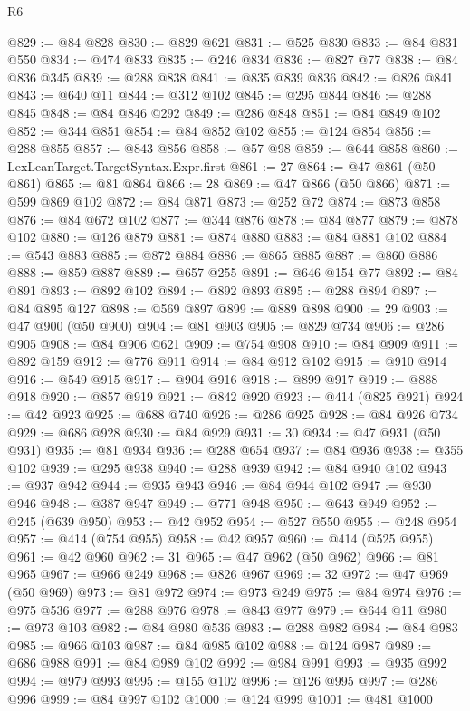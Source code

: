 \begin{lexlean}{R6}
\begin{coremodule}
@829 := @84 @828
@830 := @829 @621
@831 := @525 @830
@833 := @84 @831 @550
@834 := @474 @833
@835 := @246 @834
@836 := @827 @77
@838 := @84 @836 @345
@839 := @288 @838
@841 := @835 @839 @836
@842 := @826 @841
@843 := @640 @11
@844 := @312 @102
@845 := @295 @844
@846 := @288 @845
@848 := @84 @846 @292
@849 := @286 @848
@851 := @84 @849 @102
@852 := @344 @851
@854 := @84 @852 @102
@855 := @124 @854
@856 := @288 @855
@857 := @843 @856
@858 := @57 @98
@859 := @644 @858
@860 := LexLeanTarget.TargetSyntax.Expr.first
@861 := 27
@864 := @47 @861 (@50 @861)
@865 := @81 @864
@866 := 28
@869 := @47 @866 (@50 @866)
@871 := @599 @869 @102
@872 := @84 @871
@873 := @252 @72
@874 := @873 @858
@876 := @84 @672 @102
@877 := @344 @876
@878 := @84 @877
@879 := @878 @102
@880 := @126 @879
@881 := @874 @880
@883 := @84 @881 @102
@884 := @543 @883
@885 := @872 @884
@886 := @865 @885
@887 := @860 @886
@888 := @859 @887
@889 := @657 @255
@891 := @646 @154 @77
@892 := @84 @891
@893 := @892 @102
@894 := @892 @893
@895 := @288 @894
@897 := @84 @895 @127
@898 := @569 @897
@899 := @889 @898
@900 := 29
@903 := @47 @900 (@50 @900)
@904 := @81 @903
@905 := @829 @734
@906 := @286 @905
@908 := @84 @906 @621
@909 := @754 @908
@910 := @84 @909
@911 := @892 @159
@912 := @776 @911
@914 := @84 @912 @102
@915 := @910 @914
@916 := @549 @915
@917 := @904 @916
@918 := @899 @917
@919 := @888 @918
@920 := @857 @919
@921 := @842 @920
@923 := @414 (@825 @921)
@924 := @42 @923
@925 := @688 @740
@926 := @286 @925
@928 := @84 @926 @734
@929 := @686 @928
@930 := @84 @929
@931 := 30
@934 := @47 @931 (@50 @931)
@935 := @81 @934
@936 := @288 @654
@937 := @84 @936
@938 := @355 @102
@939 := @295 @938
@940 := @288 @939
@942 := @84 @940 @102
@943 := @937 @942
@944 := @935 @943
@946 := @84 @944 @102
@947 := @930 @946
@948 := @387 @947
@949 := @771 @948
@950 := @643 @949
@952 := @245 (@639 @950)
@953 := @42 @952
@954 := @527 @550
@955 := @248 @954
@957 := @414 (@754 @955)
@958 := @42 @957
@960 := @414 (@525 @955)
@961 := @42 @960
@962 := 31
@965 := @47 @962 (@50 @962)
@966 := @81 @965
@967 := @966 @249
@968 := @826 @967
@969 := 32
@972 := @47 @969 (@50 @969)
@973 := @81 @972
@974 := @973 @249
@975 := @84 @974
@976 := @975 @536
@977 := @288 @976
@978 := @843 @977
@979 := @644 @11
@980 := @973 @103
@982 := @84 @980 @536
@983 := @288 @982
@984 := @84 @983
@985 := @966 @103
@987 := @84 @985 @102
@988 := @124 @987
@989 := @686 @988
@991 := @84 @989 @102
@992 := @984 @991
@993 := @935 @992
@994 := @979 @993
@995 := @155 @102
@996 := @126 @995
@997 := @286 @996
@999 := @84 @997 @102
@1000 := @124 @999
@1001 := @481 @1000

\end{coremodule}
\end{lexlean}
